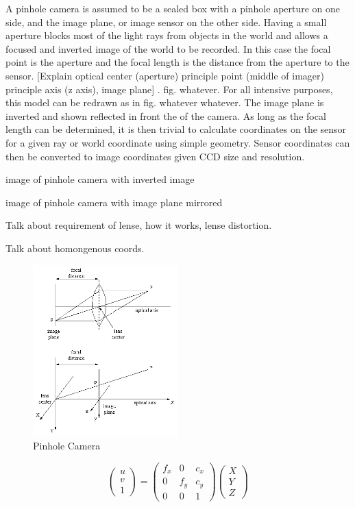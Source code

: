 A pinhole camera is assumed to be a sealed box with a pinhole aperture on one side, and the image
plane, or image sensor on the other side.  Having a small aperture blocks most of the light rays
from objects in the world and allows a focused and inverted image of the world to be recorded. 
In this case the focal point is the aperture and the focal length is the distance from the
aperture to the sensor. [Explain optical center (aperture) principle point (middle of imager)
principle axis (z axis), image plane] . fig. whatever. For all intensive purposes, this model can
be redrawn as in fig. whatever whatever. The image plane is inverted and shown reflected in front
the of the camera.  As long as the focal length can be determined, it is then trivial to calculate
coordinates on the sensor for a given ray or world coordinate using simple geometry. Sensor
coordinates can then be converted to image coordinates given CCD size and resolution.

image of pinhole camera with inverted image

image of pinhole camera with image plane mirrored

Talk about requirement of lense, how it works, lense distortion.

Talk about homongenous coords.

\begin{figure}[h!]
  \caption{Pinhole Camera}
  \centering
    \includegraphics[width=0.5\textwidth]{chapters/images/pinhole_camera}
\end{figure}

\begin{equation}
 \begin{pmatrix}
  u \\
  v \\
  1 
 \end{pmatrix} =
 \begin{pmatrix}
  f_x & 0 & c_x \\
  0 & f_y & c_y \\
  0 & 0   & 1 
 \end{pmatrix}
 \begin{pmatrix}
  X \\ Y \\ Z
 \end{pmatrix}
\end{equation}


